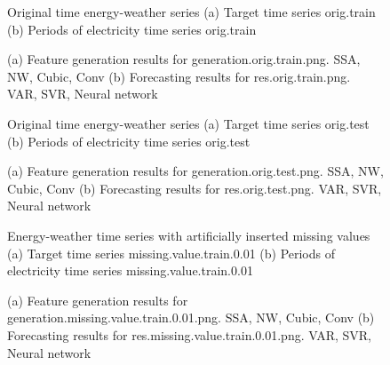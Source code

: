 \documentclass[12pt]{article}
\begin{document}
\begin{figure}
\centering
{}
\caption{Original time energy-weather series	(a) Target time series	orig.train	(b) Periods of electricity time series	orig.train	}
\end{figure}


\begin{figure}
\centering
{}
\caption{(a)	Feature generation results for	generation.orig.train.png.	SSA, NW, Cubic, Conv	(b)	Forecasting results for	res.orig.train.png.	VAR, SVR, Neural network	}
\end{figure}


\begin{figure}
\centering
{}
\caption{Original time energy-weather series	(a) Target time series	orig.test	(b) Periods of electricity time series	orig.test	}
\end{figure}


\begin{figure}
\centering
{}
\caption{(a)	Feature generation results for	generation.orig.test.png.	SSA, NW, Cubic, Conv	(b)	Forecasting results for	res.orig.test.png.	VAR, SVR, Neural network	}
\end{figure}


\begin{figure}
\centering
{}
\caption{Energy-weather time series with artificially inserted missing values	(a) Target time series	missing.value.train.0.01	(b) Periods of electricity time series	missing.value.train.0.01	}
\end{figure}


\begin{figure}
\centering
{}
\caption{(a)	Feature generation results for	generation.missing.value.train.0.01.png.	SSA, NW, Cubic, Conv	(b)	Forecasting results for	res.missing.value.train.0.01.png.	VAR, SVR, Neural network	}
\end{figure}
\end{document}
